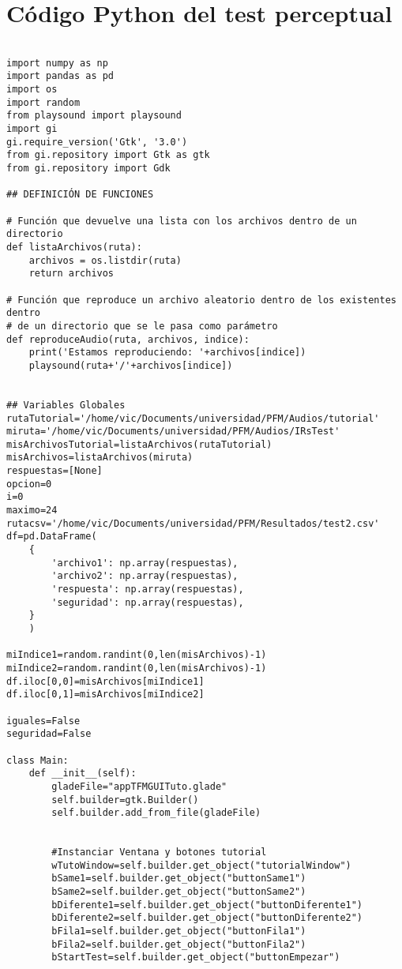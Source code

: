 \documentclass[11pt,a4paper,twoside]{book}
\begin{document}
\section{Código Python del test perceptual}
\begin{verbatim}

import numpy as np
import pandas as pd
import os
import random
from playsound import playsound
import gi
gi.require_version('Gtk', '3.0')
from gi.repository import Gtk as gtk
from gi.repository import Gdk

## DEFINICIÓN DE FUNCIONES

# Función que devuelve una lista con los archivos dentro de un directorio
def listaArchivos(ruta):
    archivos = os.listdir(ruta)
    return archivos

# Función que reproduce un archivo aleatorio dentro de los existentes dentro 
# de un directorio que se le pasa como parámetro
def reproduceAudio(ruta, archivos, indice):
    print('Estamos reproduciendo: '+archivos[indice])
    playsound(ruta+'/'+archivos[indice])


## Variables Globales
rutaTutorial='/home/vic/Documents/universidad/PFM/Audios/tutorial'
miruta='/home/vic/Documents/universidad/PFM/Audios/IRsTest'
misArchivosTutorial=listaArchivos(rutaTutorial)
misArchivos=listaArchivos(miruta)
respuestas=[None]
opcion=0
i=0
maximo=24
rutacsv='/home/vic/Documents/universidad/PFM/Resultados/test2.csv'
df=pd.DataFrame(
    {
        'archivo1': np.array(respuestas),
        'archivo2': np.array(respuestas),
        'respuesta': np.array(respuestas),
        'seguridad': np.array(respuestas),
    }
    )

miIndice1=random.randint(0,len(misArchivos)-1)
miIndice2=random.randint(0,len(misArchivos)-1)
df.iloc[0,0]=misArchivos[miIndice1]
df.iloc[0,1]=misArchivos[miIndice2]

iguales=False
seguridad=False

class Main:
    def __init__(self):
        gladeFile="appTFMGUITuto.glade"
        self.builder=gtk.Builder()
        self.builder.add_from_file(gladeFile)


        #Instanciar Ventana y botones tutorial
        wTutoWindow=self.builder.get_object("tutorialWindow")
        bSame1=self.builder.get_object("buttonSame1")
        bSame2=self.builder.get_object("buttonSame2")
        bDiferente1=self.builder.get_object("buttonDiferente1")
        bDiferente2=self.builder.get_object("buttonDiferente2")
        bFila1=self.builder.get_object("buttonFila1")
        bFila2=self.builder.get_object("buttonFila2")
        bStartTest=self.builder.get_object("buttonEmpezar")
        

\end{verbatim}
\end{document}
